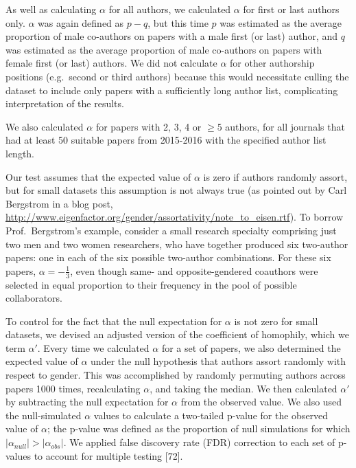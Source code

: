 \documentclass[12pt,]{article}
\begin{document}
As well as calculating \(\alpha\) for all authors, we calculated
\(\alpha\) for first or last authors only. \(\alpha\) was again defined
as \(p - q\), but this time \(p\) was estimated as the average
proportion of male co-authors on papers with a male first (or last)
author, and \(q\) was estimated as the average proportion of male
co-authors on papers with female first (or last) authors. We did not
calculate \(\alpha\) for other authorship positions (e.g.~second or
third authors) because this would necessitate culling the dataset to
include only papers with a sufficiently long author list, complicating
interpretation of the results.

We also calculated \(\alpha\) for papers with 2, 3, 4 or \({\ge}5\)
authors, for all journals that had at least 50 suitable papers from
2015-2016 with the specified author list length.

Our test assumes that the expected value of \(\alpha\) is zero if
authors randomly assort, but for small datasets this assumption is not
always true (as pointed out by Carl Bergstrom in a blog post,
\url{http://www.eigenfactor.org/gender/assortativity/note_to_eisen.rtf}).
To borrow Prof.~Bergstrom's example, consider a small research specialty
comprising just two men and two women researchers, who have together
produced six two-author papers: one in each of the six possible
two-author combinations. For these six papers,
\(\alpha = -\frac{1}{3}\), even though same- and opposite-gendered
coauthors were selected in equal proportion to their frequency in the
pool of possible collaborators.

To control for the fact that the null expectation for \(\alpha\) is not
zero for small datasets, we devised an adjusted version of the
coefficient of homophily, which we term \(\alpha'\). Every time we
calculated \(\alpha\) for a set of papers, we also determined the
expected value of \(\alpha\) under the null hypothesis that authors
assort randomly with respect to gender. This was accomplished by
randomly permuting authors across papers 1000 times, recalculating
\(\alpha\), and taking the median. We then calculated \(\alpha'\) by
subtracting the null expectation for \(\alpha\) from the observed value.
We also used the null-simulated \(\alpha\) values to calculate a
two-tailed p-value for the observed value of \(\alpha\); the p-value was
defined as the proportion of null simulations for which
\(|\alpha_{null}| > |\alpha_{obs}|\). We applied false discovery rate
(FDR) correction to each set of p-values to account for multiple testing
{[}72{]}.
\end{document}
